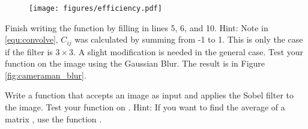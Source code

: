 \begin{figure}[H]
    \texttt{[image: figures/efficiency.pdf]}
\end{figure}
\label{prob:filter}
\leavevmode
Finish writing the function  by filling in lines 5, 6, and 10.  Hint: Note in \ref{equ:convolve}, $C_{ij}$ was calculated by summing from -1 to 1.  This is only the case if the filter  is $3 \times 3$. A slight modification is needed in the general case.  Test your function on the image  using the Gaussian Blur. The result is in Figure \ref{fig:cameraman_blur}.

Write a function that accepts an image as input and applies the Sobel filter to the image.  Test your function on .  Hint: If you want to find the average of a matrix , use the function .

